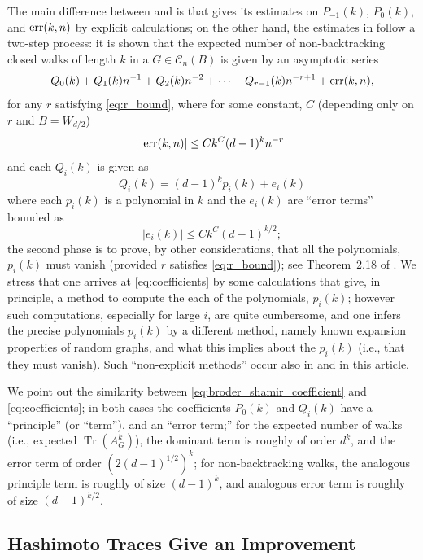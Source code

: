 \documentclass{memo-l}
\theoremstyle{plain}
\theoremstyle{definition}
\numberwithin{section}{chapter}
\numberwithin{equation}{chapter}
\DeclareMathOperator{\Tr}{Tr}
\theoremstyle{plain}
\theoremstyle{definition}
\newcommand\cC{\mathcal{C}}
\begin{document}
The main difference between
\cite{broder} and \cite{friedman_random_graphs} is that \cite{broder}
gives its estimates on $P_{-1}(k)$, $P_0(k)$, and
${\rm err}(k,n)$ by explicit calculations;
on the other hand, the estimates in \cite{friedman_random_graphs} 
follow a two-step process: 
it is shown that 
the expected number of non-backtracking closed walks of length $k$ in a 
$G\in\cC_n(B)$ is given by
an asymptotic series 
$$
Q_0(k)+
Q_1(k)n^{-1} + Q_2(k)n^{-2} + \cdots + Q_{r-1}(k) n^{-r+1} +
{\rm err}(k,n),
$$
for any $r$ satisfying \eqref{eq:r_bound}, where for some constant,
$C$ (depending only on $r$ and $B=W_{d/2}$)
$$
|{\rm err}(k,n)| \le C k^C (d-1)^k n^{-r} 
$$
and each $Q_i(k)$ is given as
\begin{equation}\label{eq:coefficients}
Q_i(k) = (d-1)^k p_i(k) + e_i(k)
\end{equation}
where each $p_i(k)$ is a polynomial in $k$ and the $e_i(k)$ are ``error terms''
bounded as
$$
|e_i(k)| \le Ck^C (d-1)^{k/2} ;
$$
the second phase is to prove, by other considerations, that all the
polynomials, $p_i(k)$ must vanish (provided $r$ satisfies
\eqref{eq:r_bound}); see Theorem~2.18 of \cite{friedman_random_graphs}.
We stress that
one arrives at \eqref{eq:coefficients} by some calculations that 
give, in principle, a method to
compute the each of the polynomials, $p_i(k)$; however such computations,
especially for large $i$, are quite cumbersome, and one infers the
precise polynomials $p_i(k)$
by a different method, namely known expansion properties of random graphs,
and what this implies about the $p_i(k)$ (i.e., that they must vanish).
Such ``non-explicit methods'' occur also in \cite{friedman_alon} and
in this article.

We point out the similarity between
\eqref{eq:broder_shamir_coefficient} and
\eqref{eq:coefficients}; in both cases the coefficients $P_0(k)$ 
and $Q_i(k)$ have a
``principle'' (or ``term''), and an ``error term;'' for the expected
number of walks (i.e., expected $\Tr(A_G^k)$),
the dominant term is roughly of order $d^k$, and the error
term of order $(2(d-1)^{1/2})^k$;
for non-backtracking walks, the analogous principle term is roughly
of size $(d-1)^k$, and analogous error term is roughly of size
$(d-1)^{k/2}$.


\subsection{Hashimoto Traces Give an Improvement}
\label{sb:hashimoto_improvement}
\end{document}
